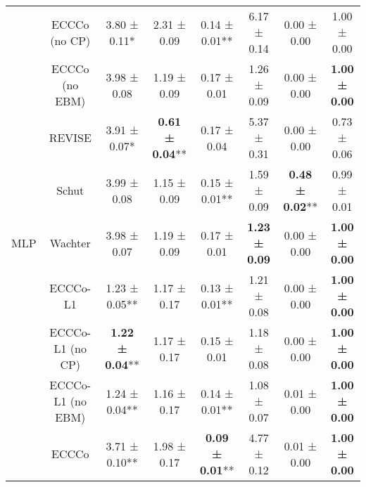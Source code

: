 \begin{table}
{\begin{tabular}[t]{cccccccc}
 & ECCCo (no CP) & 3.80 ± 0.11*\hphantom{*} & 2.31 ± 0.09\hphantom{*}\hphantom{*} & 0.14 ± 0.01** & 6.17 ± 0.14\hphantom{*}\hphantom{*} & 0.00 ± 0.00\hphantom{*}\hphantom{*} & 1.00 ± 0.00\hphantom{*}\hphantom{*}\\

 & ECCCo (no EBM) & 3.98 ± 0.08\hphantom{*}\hphantom{*} & 1.19 ± 0.09\hphantom{*}\hphantom{*} & 0.17 ± 0.01\hphantom{*}\hphantom{*} & 1.26 ± 0.09\hphantom{*}\hphantom{*} & 0.00 ± 0.00\hphantom{*}\hphantom{*} & \textbf{1.00 ± 0.00}\hphantom{*}\hphantom{*}\\

 & REVISE & 3.91 ± 0.07*\hphantom{*} & \textbf{0.61 ± 0.04}** & 0.17 ± 0.04\hphantom{*}\hphantom{*} & 5.37 ± 0.31\hphantom{*}\hphantom{*} & 0.00 ± 0.00\hphantom{*}\hphantom{*} & 0.73 ± 0.06\hphantom{*}\hphantom{*}\\

 & Schut & 3.99 ± 0.08\hphantom{*}\hphantom{*} & 1.15 ± 0.09\hphantom{*}\hphantom{*} & 0.15 ± 0.01** & 1.59 ± 0.09\hphantom{*}\hphantom{*} & \textbf{0.48 ± 0.02}** & 0.99 ± 0.01\hphantom{*}\hphantom{*}\\

\multirow[t]{-10}{*}{\centering\arraybackslash MLP} & Wachter & 3.98 ± 0.07\hphantom{*}\hphantom{*} & 1.19 ± 0.09\hphantom{*}\hphantom{*} & 0.17 ± 0.01\hphantom{*}\hphantom{*} & \textbf{1.23 ± 0.09}\hphantom{*}\hphantom{*} & 0.00 ± 0.00\hphantom{*}\hphantom{*} & \textbf{1.00 ± 0.00}\hphantom{*}\hphantom{*}\\
\cmidrule{1-8}
 & ECCCo-L1 & 1.23 ± 0.05** & 1.17 ± 0.17\hphantom{*}\hphantom{*} & 0.13 ± 0.01** & 1.21 ± 0.08\hphantom{*}\hphantom{*} & 0.00 ± 0.00\hphantom{*}\hphantom{*} & \textbf{1.00 ± 0.00}\hphantom{*}\hphantom{*}\\

 & ECCCo-L1 (no CP) & \textbf{1.22 ± 0.04}** & 1.17 ± 0.17\hphantom{*}\hphantom{*} & 0.15 ± 0.01\hphantom{*}\hphantom{*} & 1.18 ± 0.08\hphantom{*}\hphantom{*} & 0.00 ± 0.00\hphantom{*}\hphantom{*} & \textbf{1.00 ± 0.00}\hphantom{*}\hphantom{*}\\

 & ECCCo-L1 (no EBM) & 1.24 ± 0.04** & 1.16 ± 0.17\hphantom{*}\hphantom{*} & 0.14 ± 0.01** & 1.08 ± 0.07\hphantom{*}\hphantom{*} & 0.01 ± 0.00\hphantom{*}\hphantom{*} & \textbf{1.00 ± 0.00}\hphantom{*}\hphantom{*}\\

 & ECCCo & 3.71 ± 0.10** & 1.98 ± 0.17\hphantom{*}\hphantom{*} & \textbf{0.09 ± 0.01}** & 4.77 ± 0.12\hphantom{*}\hphantom{*} & 0.01 ± 0.00\hphantom{*}\hphantom{*} & \textbf{1.00 ± 0.00}\hphantom{*}\hphantom{*}\\


\end{tabular}}
\end{table}
